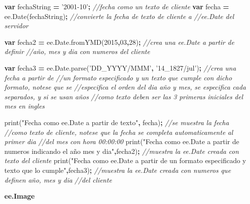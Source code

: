 \documentclass[
]{article}
\newenvironment{Shaded}{\begin{snugshade}}{\end{snugshade}}
\newcommand{\AttributeTok}[1]{\textcolor[rgb]{0.77,0.63,0.00}{#1}}
\newcommand{\CommentTok}[1]{\textcolor[rgb]{0.56,0.35,0.01}{\textit{#1}}}
\newcommand{\DecValTok}[1]{\textcolor[rgb]{0.00,0.00,0.81}{#1}}
\newcommand{\KeywordTok}[1]{\textcolor[rgb]{0.13,0.29,0.53}{\textbf{#1}}}
\newcommand{\NormalTok}[1]{#1}
\newcommand{\OperatorTok}[1]{\textcolor[rgb]{0.81,0.36,0.00}{\textbf{#1}}}
\newcommand{\StringTok}[1]{\textcolor[rgb]{0.31,0.60,0.02}{#1}}
\newcommand{\VariableTok}[1]{\textcolor[rgb]{0.00,0.00,0.00}{#1}}
\begin{document}
\begin{Shaded}
\begin{Highlighting}[]
\KeywordTok{var}\NormalTok{ fechaString }\OperatorTok{=} \StringTok{'2001-10'}\OperatorTok{;}                 \CommentTok{//fecha como un texto de cliente}
\KeywordTok{var}\NormalTok{ fecha }\OperatorTok{=} \VariableTok{ee}\NormalTok{.}\AttributeTok{Date}\NormalTok{(fechaString)}\OperatorTok{;}             \CommentTok{//convierte la fecha de texto de cliente a}
\CommentTok{//ee.Date del servidor}

\KeywordTok{var}\NormalTok{ fecha2 }\OperatorTok{=} \VariableTok{ee}\NormalTok{.}\VariableTok{Date}\NormalTok{.}\AttributeTok{fromYMD}\NormalTok{(}\DecValTok{2015}\OperatorTok{,}\DecValTok{03}\OperatorTok{,}\DecValTok{28}\NormalTok{)}\OperatorTok{;}     \CommentTok{//crea una ee.Date a partir de definir }
\CommentTok{//año, mes y dia con numeros del cliente}

\KeywordTok{var}\NormalTok{ fecha3 }\OperatorTok{=} \VariableTok{ee}\NormalTok{.}\VariableTok{Date}\NormalTok{.}\AttributeTok{parse}\NormalTok{(}\StringTok{'DD_YYYY/MMM'}\OperatorTok{,} \StringTok{'14_1827/jul'}\NormalTok{)}\OperatorTok{;} \CommentTok{//crea una fecha a partir de }
\CommentTok{//un formato especificado y un texto que cumple con dicho formato, notese que se }
\CommentTok{//especifica el orden del dia año y mes, se especifica cada separados, y si se usan años}
\CommentTok{//como texto deben ser las 3 primeras iniciales del mes en ingles }

\AttributeTok{print}\NormalTok{(}\StringTok{"Fecha como ee.Date a partir de texto"}\OperatorTok{,}\NormalTok{ fecha)}\OperatorTok{;}            \CommentTok{//se muestra la fecha }
\CommentTok{//como texto de cliente, notese que la fecha se completa automaticamente al primer dia }
\CommentTok{//del mes con hora 00:00:00 }
\AttributeTok{print}\NormalTok{(}\StringTok{"Fecha como ee.Date a partir de numeros indicando el año mes y dia"}\OperatorTok{,}\NormalTok{fecha2)}\OperatorTok{;}      
\CommentTok{//muestra la ee.Date creada con texto del cliente}
\AttributeTok{print}\NormalTok{(}\StringTok{"Fecha como ee.Date a partir de un formato especificado y texto que lo cumple"}\OperatorTok{,}\NormalTok{fecha3)}\OperatorTok{;}   \CommentTok{//muestra la ee.Date creada con numeros que definen año, mes y dia }
\CommentTok{//del cliente}
\end{Highlighting}
\end{Shaded}

\textbf{ee.Image}
\end{document}
